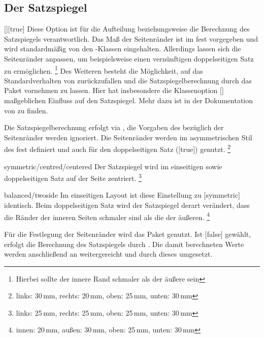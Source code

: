 \subsection{Der Satzspiegel}
\begin{Declaration}[v2.03]{[\PSet]}[true]%
\printdeclarationlist%
%
%
%
%
%
Diese Option ist für die Aufteilung beziehungsweise die Berechnung des 
Satzspiegels verantwortlich. Das Maß der Seitenränder ist im \CD fest 
vorgegeben und wird standardmäßig von den \TUDScript-Klassen eingehalten. 
Allerdings lassen sich die Seitenränder anpassen, um beispielsweise einen 
vernünftigen doppelseitigen Satz zu ermöglichen.%
\footnote{Hierbei sollte der innere Rand schmaler als der äußere sein}
Des Weiteren besteht die Möglichkeit, auf das Standardverhalten von 
\KOMAScript{} zurückzufallen und die Satzspiegelberechnung durch das Paket
 vornehmen zu lassen. Hier hat insbesondere die Klassenoption 
[\PSet] maßgeblichen Einfluss auf den Satzspiegel. Mehr dazu ist in 
der Dokumentation von \KOMAScript zu finden.
%
\begin{values}
\itemfalse
  Die Satzspiegelberechnung erfolgt via , die Vorgaben des 
  \CDs bezüglich der Seitenränder werden ignoriert.
\itemtrue*[asymmetric/cd]
  Die Seitenränder werden im asymmetrischen Stil des \CDs fest definiert und 
  auch für den doppelseitigen Satz ([true]) genutzt.%
  \footnote{links: 30\,mm, rechts: 20\,mm, oben: 25\,mm, unten: 30\,mm}
\item[symmetric/centred/centered]
  Der Satzspiegel wird im einseitigen sowie doppelseitigen Satz auf der Seite 
  zentriert.%
  \footnote{links: 25\,mm, rechts: 25\,mm, oben: 25\,mm, unten: 30\,mm}
\item[balanced/twoside]
  Im einseitigen Layout ist diese Einstellung zu [symmetric] 
  identisch. Beim doppelseitigen Satz wird der Satzspiegel derart verändert, 
  dass die Ränder der inneren Seiten schmaler sind als die der äußeren.%
  \footnote{innen: 20\,mm, außen: 30\,mm, oben: 25\,mm, unten: 30\,mm}
\end{values}
%
Für die Festlegung der Seitenränder wird das Paket  genutzt. 
Ist [false] gewählt, erfolgt die Berechnung des Satzspiegels 
durch . Die damit berechneten Werte werden anschließend an 
 weitergereicht und durch dieses umgesetzt.
\end{Declaration}

